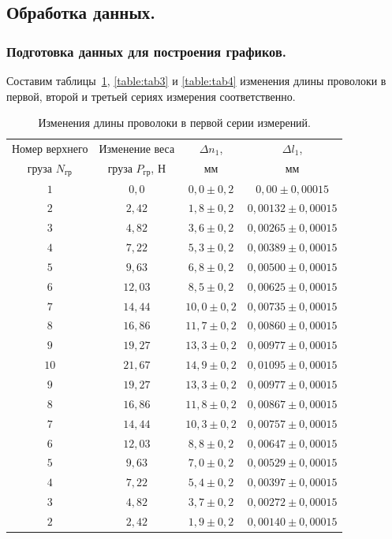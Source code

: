 \documentclass[a4paper,11pt]{article}
\begin{document}
\subsection{Обработка данных.}
\subsubsection{Подготовка данных для построения графиков.}
Составим таблицы~\ref{table:tab2}, \ref{table:tab3} и \ref{table:tab4} изменения длины проволоки в первой, второй и третьей сериях измерения соответственно.
\begin{table}[h!]
\centering
\begin{tabular}{ ||c|c|c|c|| }
  \hline
  Номер верхнего & Изменение веса & $\Delta n_{1}$, & $\Delta l_{1}$, \\
  груза $N_{гр}$ & груза $P_{гр}$, $Н$ & $мм$ & $мм$ \\
  \hline
  $1$ & $0,0$ & $0,0 \pm 0,2$ & $0,00 \pm 0,00015$ \\
  $2$ & $2,42$ & $1,8 \pm 0,2$ & $0,00132 \pm 0,00015$ \\
  $3$ & $4,82$ & $3,6 \pm 0,2$ & $0,00265 \pm 0,00015$ \\
  $4$ & $7,22$ & $5,3 \pm 0,2$ & $0,00389 \pm 0,00015$ \\
  $5$ & $9,63$ & $6,8 \pm 0,2$ & $0,00500 \pm 0,00015$ \\
  $6$ & $12,03$ & $8,5 \pm 0,2$ & $0,00625 \pm 0,00015$ \\
  $7$ & $14,44$ & $10,0 \pm 0,2$ & $0,00735 \pm 0,00015$ \\
  $8$ & $16,86$ & $11,7 \pm 0,2$ & $0,00860 \pm 0,00015$ \\
  $9$ & $19,27$ & $13,3 \pm 0,2$ & $0,00977 \pm 0,00015$ \\
  $10$ & $21,67$ & $14,9 \pm 0,2$ & $0,01095 \pm 0,00015$ \\
  $9$ & $19,27$ & $13,3 \pm 0,2$ & $0,00977 \pm 0,00015$ \\
  $8$ & $16,86$ & $11,8 \pm 0,2$ & $0,00867 \pm 0,00015$ \\
  $7$ & $14,44$ & $10,3 \pm 0,2$ & $0,00757 \pm 0,00015$ \\
  $6$ & $12,03$ & $8,8 \pm 0,2$ & $0,00647 \pm 0,00015$ \\
  $5$ & $9,63$ & $7,0 \pm 0,2$ & $0,00529 \pm 0,00015$ \\
  $4$ & $7,22$ & $5,4 \pm 0,2$ & $0,00397 \pm 0,00015$ \\
  $3$ & $4,82$ & $3,7 \pm 0,2$ & $0,00272 \pm 0,00015$ \\
  $2$ & $2,42$ & $1,9 \pm 0,2$ & $0,00140 \pm 0,00015$ \\
  \hline
\end{tabular}
\caption{Изменения длины проволоки в первой серии измерений.}
\label{table:tab2}
\end{table}
\end{document}
